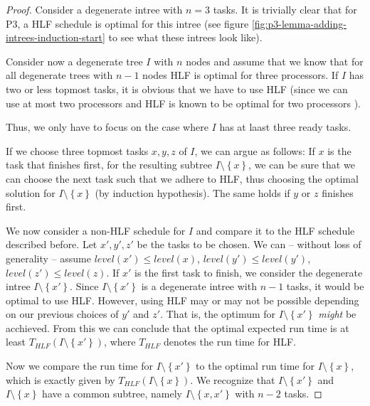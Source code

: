 \begin{proof}
  Consider a degenerate intree with $n=3$ tasks. It is trivially clear that for P3, a HLF schedule is optimal for this intree (see figure \ref{fig:p3-lemma-adding-intrees-induction-start} to see what these intrees look like).
  
  Consider now a degenerate tree $I$ with $n$ nodes and assume that we know that for all degenerate trees with $n-1$ nodes HLF is optimal for three processors. If $I$ has two or less topmost tasks, it is obvious that we have to use HLF (since we can use at most two processors and HLF is known to be optimal for two processors ).

  Thus, we only have to focus on the case where $I$ has at laast three ready tasks.

  If we choose three topmost tasks $x,y,z$ of $I$, we can argue as follows: If $x$ is the task that finishes first, for the resulting subtree $I\setminus \left\{ x \right\}$, we can be sure that we can choose the next task such that we adhere to HLF, thus choosing the optimal solution for $I\setminus\left\{ x \right\}$ (by induction hypothesis). The same holds if $y$ or $z$ finishes first.
  
  We now consider a non-HLF schedule for $I$ and compare it to the HLF schedule described before.
  Let $x',y',z'$ be the tasks to be chosen. We can -- without loss of generality -- assume $level(x')\leq level(x)$, $level(y')\leq level(y')$, $level(z')\leq level(z)$. If $x'$ is the first task to finish, we consider the degenerate intree $I\setminus\left\{ x' \right\}$. Since $I \setminus \left\{ x' \right\}$ is a degenerate intree with $n-1$ tasks, it would be optimal to use HLF. However, using HLF may or may not be possible depending on our previous choices of $y'$ and $z'$. That is, the optimum for $I\setminus\left\{ x' \right\}$ \emph{might} be acchieved. From this we can conclude that the optimal expected run time is at least $T_{HLF}\left( I\setminus\left\{ x' \right\} \right)$, where $T_{HLF}$ denotes the run time for HLF.

  Now we compare the run time for $I\setminus\left\{ x' \right\}$ to the optimal run time for $I \setminus\left\{ x \right\}$, which is exactly given by $T_{HLF}\left( I \setminus\left\{ x \right\} \right)$. We recognize that $I\setminus\left\{ x' \right\}$ and $I\setminus\left\{ x \right\}$ have a common subtree, namely $I\setminus\left\{ x,x' \right\}$ with $n-2$ tasks.
  

\end{proof}

